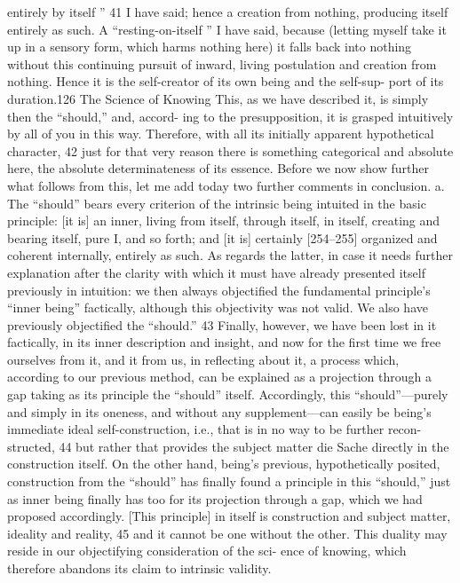 entirely by itself ” 41 I have said; hence a creation from nothing, producing itself
entirely as such. A “resting-on-itself ” I have said, because (letting myself take
it up in a sensory form, which harms nothing here) it falls back into nothing
without this continuing pursuit of inward, living postulation and creation
from nothing. Hence it is the self-creator of its own being and the self-sup-
port of its duration.126
The Science of Knowing
This, as we have described it, is simply then the “should,” and, accord-
ing to the presupposition, it is grasped intuitively by all of you in this way.
Therefore, with all its initially apparent hypothetical character, 42 just for that
very reason there is something categorical and absolute here, the absolute
determinateness of its essence. Before we now show further what follows from
this, let me add today two further comments in conclusion.
a. The “should” bears every criterion of the intrinsic being intuited in the
basic principle: [it is] an inner, living from itself, through itself, in itself,
creating and bearing itself, pure I, and so forth; and [it is] certainly
[254–255] organized and coherent internally, entirely as such. As regards
the latter, in case it needs further explanation after the clarity with which
it must have already presented itself previously in intuition: we then always
objectified the fundamental principle’s “inner being” factically, although
this objectivity was not valid. We also have previously objectified the
“should.” 43 Finally, however, we have been lost in it factically, in its inner
description and insight, and now for the first time we free ourselves from
it, and it from us, in reflecting about it, a process which, according to our
previous method, can be explained as a projection through a gap taking as
its principle the “should” itself. Accordingly, this “should”—purely and
simply in its oneness, and without any supplement—can easily be being’s
immediate ideal self-construction, i.e., that is in no way to be further recon-
structed, 44 but rather that provides the subject matter {die Sache } directly in
the construction itself. On the other hand, being’s previous, hypothetically
posited, construction from the “should” has finally found a principle in this
“should,” just as inner being finally has too for its projection through a gap,
which we had proposed accordingly. [This principle] in itself is construction
and subject matter, ideality and reality, 45 and it cannot be one without the
other. This duality may reside in our objectifying consideration of the sci-
ence of knowing, which therefore abandons its claim to intrinsic validity.
